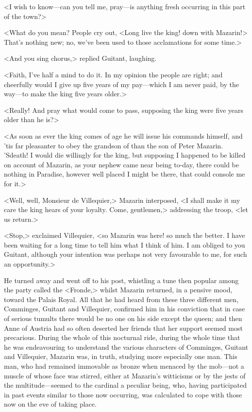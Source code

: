<I wish to know—can you tell me, pray—is anything fresh occurring in this part of the town?>

<What do you mean? People cry out, <Long live the king! down with Mazarin!> That's nothing new; no, we've been used to those acclamations for some time.>

<And you sing chorus,> replied Guitant, laughing.

<Faith, I've half a mind to do it. In my opinion the people are right; and cheerfully would I give up five years of my pay—which I am never paid, by the way—to make the king five years older.>

<Really! And pray what would come to pass, supposing the king were five years older than he is?>

<As soon as ever the king comes of age he will issue his commands himself, and 'tis far pleasanter to obey the grandson of  than the son of Peter Mazarin. 'Sdeath! I would die willingly for the king, but supposing I happened to be killed on account of Mazarin, as your nephew came near being to-day, there could be nothing in Paradise, however well placed I might be there, that could console me for it.>

<Well, well, Monsieur de Villequier,> Mazarin interposed, <I shall make it my care the king hears of your loyalty. Come, gentlemen,> addressing the troop, <let us return.>

<Stop,> exclaimed Villequier, <so Mazarin was here! so much the better. I have been waiting for a long time to tell him what I think of him. I am obliged to you Guitant, although your intention was perhaps not very favourable to me, for such an opportunity.>

He turned away and went off to his post, whistling a tune then popular among the party called the <Fronde,> whilst Mazarin returned, in a pensive mood, toward the Palais Royal. All that he had heard from these three different men, Comminges, Guitant and Villequier, confirmed him in his conviction that in case of serious tumults there would be no one on his side except the queen; and then Anne of Austria had so often deserted her friends that her support seemed most precarious. During the whole of this nocturnal ride, during the whole time that he was endeavouring to understand the various characters of Comminges, Guitant and Villequier, Mazarin was, in truth, studying more especially one man. This man, who had remained immovable as bronze when menaced by the mob—not a muscle of whose face was stirred, either at Mazarin's witticisms or by the jests of the multitude—seemed to the cardinal a peculiar being, who, having participated in past events similar to those now occurring, was calculated to cope with those now on the eve of taking place.

